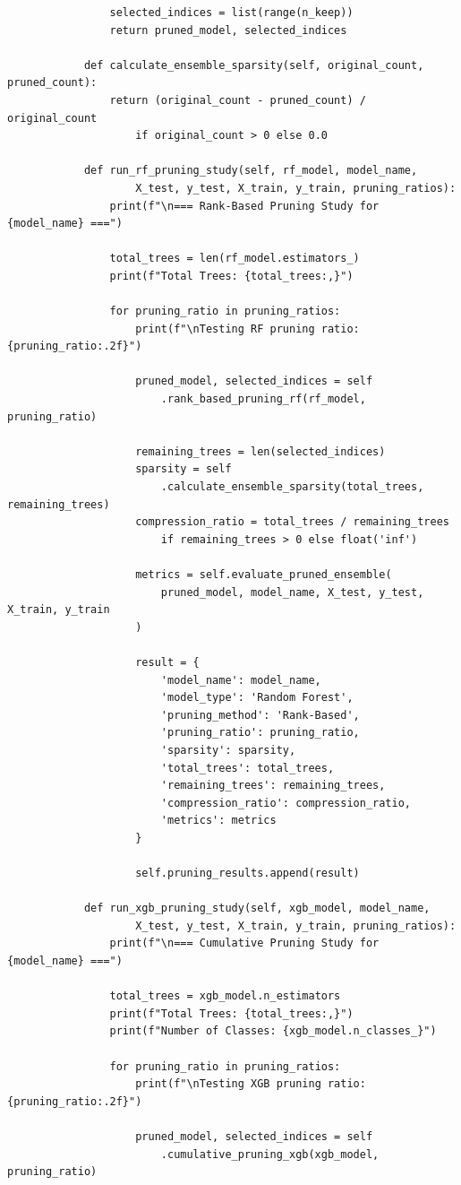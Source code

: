 \documentclass[a4paper,12pt]{report}
\begin{document}
\begin{verbatim}
				selected_indices = list(range(n_keep))
				return pruned_model, selected_indices
		
			def calculate_ensemble_sparsity(self, original_count, pruned_count):
				return (original_count - pruned_count) / original_count 
					if original_count > 0 else 0.0
		
			def run_rf_pruning_study(self, rf_model, model_name,
					X_test, y_test, X_train, y_train, pruning_ratios):
				print(f"\n=== Rank-Based Pruning Study for {model_name} ===")
				
				total_trees = len(rf_model.estimators_)
				print(f"Total Trees: {total_trees:,}")
				
				for pruning_ratio in pruning_ratios:
					print(f"\nTesting RF pruning ratio: {pruning_ratio:.2f}")
					
					pruned_model, selected_indices = self
						.rank_based_pruning_rf(rf_model, pruning_ratio)
					
					remaining_trees = len(selected_indices)
					sparsity = self
						.calculate_ensemble_sparsity(total_trees, remaining_trees)
					compression_ratio = total_trees / remaining_trees 
						if remaining_trees > 0 else float('inf')
					
					metrics = self.evaluate_pruned_ensemble(
						pruned_model, model_name, X_test, y_test, X_train, y_train
					)
					
					result = {
						'model_name': model_name,
						'model_type': 'Random Forest',
						'pruning_method': 'Rank-Based',
						'pruning_ratio': pruning_ratio,
						'sparsity': sparsity,
						'total_trees': total_trees,
						'remaining_trees': remaining_trees,
						'compression_ratio': compression_ratio,
						'metrics': metrics
					}
					
					self.pruning_results.append(result)
		
			def run_xgb_pruning_study(self, xgb_model, model_name, 
					X_test, y_test, X_train, y_train, pruning_ratios):
				print(f"\n=== Cumulative Pruning Study for {model_name} ===")
				
				total_trees = xgb_model.n_estimators
				print(f"Total Trees: {total_trees:,}")
				print(f"Number of Classes: {xgb_model.n_classes_}")
				
				for pruning_ratio in pruning_ratios:
					print(f"\nTesting XGB pruning ratio: {pruning_ratio:.2f}")
					
					pruned_model, selected_indices = self
						.cumulative_pruning_xgb(xgb_model, pruning_ratio)
					

\end{verbatim}
\end{document}
